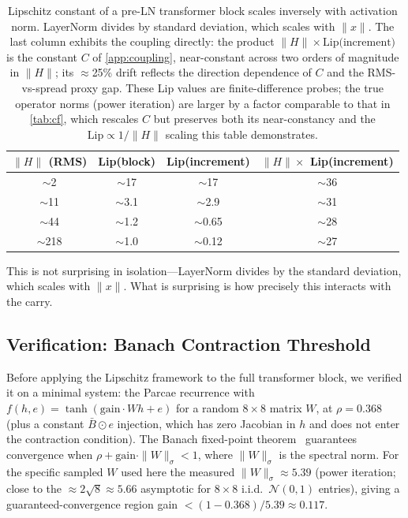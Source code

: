 \documentclass[11pt]{article}
\begin{document}
\begin{table}[ht]
\centering
\begin{tabular}{@{}cccc@{}}
\toprule
$\|H\|$ (RMS) & Lip(block) & Lip(increment) & $\|H\| \times$ Lip(increment) \\
\midrule
$\sim$2 & $\sim$17 & $\sim$17 & $\sim$36 \\
$\sim$11 & $\sim$3.1 & $\sim$2.9 & $\sim$31 \\
$\sim$44 & $\sim$1.2 & $\sim$0.65 & $\sim$28 \\
$\sim$218 & $\sim$1.0 & $\sim$0.12 & $\sim$27 \\
\bottomrule
\end{tabular}
\caption{Lipschitz constant of a pre-LN transformer block scales inversely with activation norm. LayerNorm divides by standard deviation, which scales with $\|x\|$. The last column exhibits the coupling directly: the product $\|H\| \times \text{Lip(increment)}$ is the constant $C$ of \cref{app:coupling}, near-constant across two orders of magnitude in $\|H\|$; its $\approx$25\% drift reflects the direction dependence of $C$ and the RMS-vs-spread proxy gap. These Lip values are finite-difference probes; the true operator norms (power iteration) are larger by a factor comparable to that in \cref{tab:cf}, which rescales $C$ but preserves both its near-constancy and the $\text{Lip} \propto 1/\|H\|$ scaling this table demonstrates.}
\label{tab:lipschitz-scaling}
\end{table}

This is not surprising in isolation---LayerNorm divides by the standard deviation, which scales with $\|x\|$. What is surprising is how precisely this interacts with the carry.

\subsection{Verification: Banach Contraction Threshold}

Before applying the Lipschitz framework to the full transformer block, we verified it on a minimal system: the Parcae recurrence with $f(h, e) = \tanh(\text{gain} \cdot Wh + e)$ for a random $8 \times 8$ matrix $W$, at $\rho = 0.368$ (plus a constant $\bar{B} \odot e$ injection, which has zero Jacobian in $h$ and does not enter the contraction condition). The Banach fixed-point theorem~\citep{granas2003} guarantees convergence when $\rho + \text{gain} \cdot \|W\|_\sigma < 1$, where $\|W\|_\sigma$ is the spectral norm. For the specific sampled $W$ used here the measured $\|W\|_\sigma \approx 5.39$ (power iteration; close to the $\approx 2\sqrt{8} \approx 5.66$ asymptotic for $8 \times 8$ i.i.d.\ $\mathcal{N}(0,1)$ entries), giving a guaranteed-convergence region gain $< (1 - 0.368)/5.39 \approx 0.117$.
\end{document}
